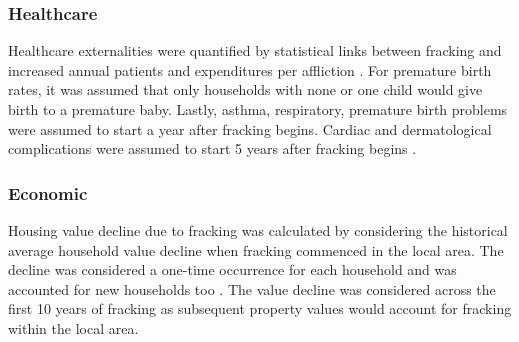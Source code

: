 \documentclass[10pt]{article}
\begin{document}
\subsubsection{Healthcare} 
Healthcare externalities were quantified by statistical links between fracking and increased annual patients and expenditures per affliction \cite{015}. For premature birth rates, it was assumed that only households with none or one child would give birth to a premature baby. Lastly, asthma, respiratory, premature birth problems were assumed to start a year after fracking begins. Cardiac and dermatological complications were assumed to start 5 years after fracking begins \cite{016}. 
\subsubsection{Economic}
Housing value decline due to fracking was calculated by considering the historical average household value decline when fracking commenced in the local area. The decline was considered a one-time occurrence for each household and was accounted for new households too \cite{doi:10.1080/21606544.2017.1398683}. The value decline was considered across the first 10 years of fracking as subsequent property values would account for fracking within the local area.  



\end{document}
